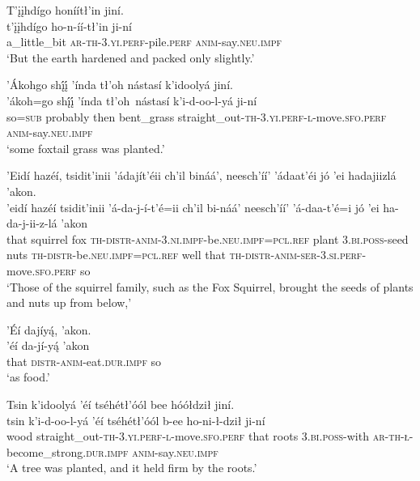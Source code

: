 \ea\label{ex:text4-8-3}
T’įįhdígo honíítł’in jiní.\\
\gll t’įįhdígo	ho-n-íí-tł’in	ji-ní\\
     a\_little\_bit	\textsc{ar}-\textsc{th}-3.\textsc{yi}.\textsc{perf}-pile.\textsc{perf}	\textsc{anim}-say.\textsc{neu}.\textsc{impf}\\
\glt `But the earth hardened and packed only slightly.'
\z

\ea\label{ex:text4-8-4}
’Ákohgo shį́į́ ’índa tł’oh nástasí k’idoolyá jiní.\\
\gll ’ákoh=go	shį́į́	’índa	tł’oh~{nástasí}	k’i-d-oo-l-yá	ji-ní\\
     so=\textsc{sub}	probably	then	bent\_grass	straight\_out-\textsc{th}-3.\textsc{yi}.\textsc{perf}-\textsc{l}-move.\textsc{sfo}.\textsc{perf}	\textsc{anim}-say.\textsc{neu}.\textsc{impf}\\
\glt `some foxtail grass was planted.'
\z

\ea\label{ex:text4-8-5}
’Eidí hazéí, tsidit’inii ’ádajít’éii ch’il bináá’, neesch’íí’ ’ádaat’éi jó ’ei hadajiizlá ’akon.\\
\gll ’eidí	hazéí	tsidit’inii	’á-da-j-í-t’é=ii	ch’il	bi-náá’	neesch’íí’	’á-daa-t’é=i	jó	’ei	ha-da-j-ii-z-lá	’akon\\
     that	squirrel	fox	\textsc{th}-\textsc{distr}-\textsc{anim}-3.\textsc{ni}.\textsc{impf}-be.\textsc{neu}.\textsc{impf}=\textsc{pcl}.\textsc{ref}	plant	3.\textsc{bi}.\textsc{poss}-seed	nuts	\textsc{th}-\textsc{distr}-be.\textsc{neu}.\textsc{impf}=\textsc{pcl}.\textsc{ref}	well	that	\textsc{th}-\textsc{distr}-\textsc{anim}-\textsc{ser}-3.\textsc{si}.\textsc{perf}-move.\textsc{sfo}.\textsc{perf}	so\\
\glt `Those of the squirrel family, such as the Fox Squirrel, brought the seeds of plants and nuts up from below,'
\z

\ea\label{ex:text4-8-6}
’Éí dajíyą́, ’akon.\\
\gll ’éí	da-jí-yą́	’akon\\
     that	\textsc{distr}-\textsc{anim}-eat.\textsc{dur}.\textsc{impf}	so\\
\glt `as food.'
\z

\ea\label{ex:text4-8-7}
Tsin k’idoolyá ’éí tséhétł’óól bee hóółdził jiní.\\
\gll tsin	k’i-d-oo-l-yá	’éí	tséhétł’óól	b-ee	ho-ni-ł-dził	ji-ní\\
     wood	straight\_out-\textsc{th}-3.\textsc{yi}.\textsc{perf}-\textsc{l}-move.\textsc{sfo}.\textsc{perf}	that roots	3.\textsc{bi}.\textsc{poss}-with	\textsc{ar}-\textsc{th}-\textsc{ł}-become\_strong.\textsc{dur}.\textsc{impf}	\textsc{anim}-say.\textsc{neu}.\textsc{impf}\\
\glt `A tree was planted, and it held firm by the roots.'
\z

